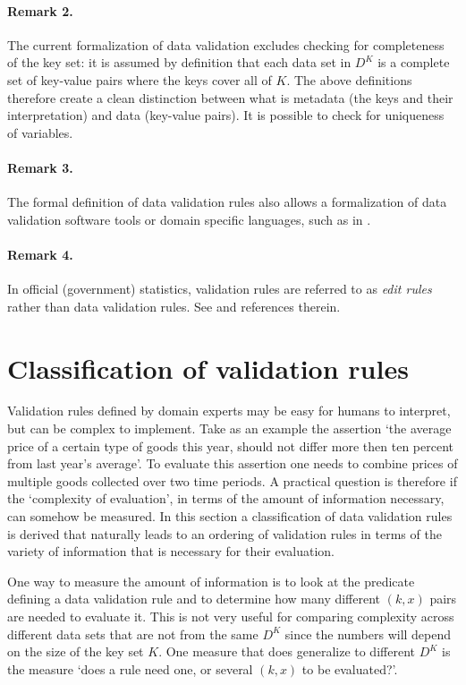 \paragraph{Remark 2.} The current formalization of data validation excludes
checking for completeness of the key set: it is assumed by definition that each
data set in $D^K$ is a complete set of key-value pairs where the keys cover all
of $K$. The above definitions therefore create a clean distinction between what
is metadata (the keys and their interpretation) and data (key-value pairs). It
is possible to check for uniqueness of variables.

\paragraph{Remark 3.} The formal definition of data validation rules also
allows a formalization of data validation software tools or domain specific
languages, such as in \cite{bantilan2020pandera, loo2019infrastructure}.


\paragraph{Remark 4.} In official (government) statistics, validation rules are
referred to as \emph{edit rules} rather than data validation rules. See
\citet{waal2011handbook} and references therein.

\section{Classification of validation rules}
Validation rules defined by domain experts may be easy for humans to interpret,
but can be complex to implement. Take as an example the assertion `the average
price of a certain type of goods this year, should not differ more then ten
percent from last year's average'. To evaluate this assertion one needs to
combine prices of multiple goods collected over two time periods. A practical
question is therefore if the `complexity of evaluation', in terms of the amount
of information necessary, can somehow be measured. In this section a
classification of data validation rules is derived that naturally leads to an
ordering of validation rules in terms of the variety of information that is
necessary for their evaluation.

One way to measure the amount of information is to look at the predicate
defining a data validation rule and to determine how many different $(k,x)$
pairs are needed to evaluate it. This is not very useful for comparing
complexity across different data sets that are not from the same $D^K$ since
the numbers will depend on the size of the key set $K$. One measure that does
generalize to different $D^K$ is the measure `does a rule need one, or several
$(k,x)$ to be evaluated?'.

